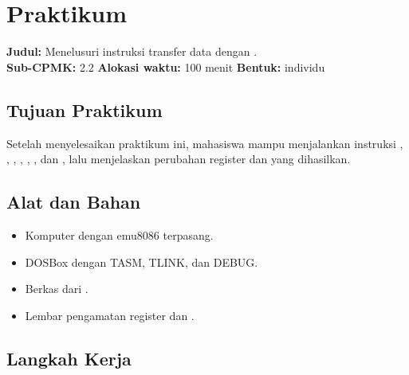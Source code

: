 \section{Praktikum}
\label{sec:praktikum-bab8}

\begin{praktikumbox}
\vspace{1.1em}
\textbf{Judul:} Menelusuri instruksi transfer data dengan
.\\[0.3em]
\textbf{Sub-CPMK:} 2.2 \quad\textbullet\quad
\textbf{Alokasi waktu:} 100 menit \quad\textbullet\quad
\textbf{Bentuk:} individu
\end{praktikumbox}

\subsection{Tujuan Praktikum}

Setelah menyelesaikan praktikum ini, mahasiswa mampu menjalankan
instruksi , , , , ,
, dan , lalu menjelaskan perubahan register dan
 yang dihasilkan.

\subsection{Alat dan Bahan}

\begin{itemize}
    \item Komputer dengan emu8086 terpasang.
    \item DOSBox dengan TASM, TLINK, dan DEBUG.
    \item Berkas  dari .
    \item Lembar pengamatan register dan .
\end{itemize}

\subsection{Langkah Kerja}

